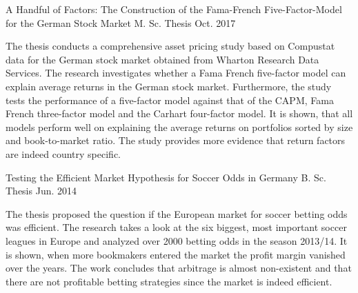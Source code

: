 

\begin{cventries}

  \cventry
    {A Handful of Factors: The Construction of the Fama-French Five-Factor-Model for the German Stock Market} %
    {M. Sc. Thesis}
    {} %
    {Oct. 2017} %
    {
      \begin{cvitems} %
        \item {The thesis conducts a comprehensive asset pricing study based on Compustat data for the German stock market obtained from Wharton Research Data Services. The research investigates whether a Fama French five-factor model can explain average returns in the German stock market. Furthermore, the study tests the performance of a five-factor model against that of the CAPM, Fama French three-factor model and the Carhart four-factor model. It is shown, that all models perform well on explaining the average returns on portfolios sorted by size and book-to-market ratio.  The study provides more evidence that return factors are indeed country specific.} %
      \end{cvitems}
    }


  \cventry
    {Testing the Efficient Market Hypothesis for Soccer Odds in Germany} %
    {B. Sc. Thesis}
    {} %
    {Jun. 2014} %
    {
      \begin{cvitems} %
        \item {The thesis proposed the question if the European market for soccer betting odds was efficient. The research takes a look at the six biggest, most important soccer leagues in Europe and analyzed over 2000 betting odds in the season 2013/14. It is shown, when more bookmakers entered the market the profit margin vanished over the years. The work concludes that arbitrage is almost non-existent and that there are not profitable betting strategies since the market is indeed efficient.}
      \end{cvitems}
    }


\end{cventries}
